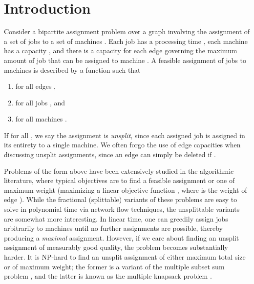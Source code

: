 \documentclass{llncs}
\begin{document}
\section{Introduction}
Consider a bipartite assignment problem over a graph  involving the assignment of a set of jobs  to a set of
machines . Each job  has a processing time , 
each machine  has a capacity , and there is a capacity
 for each edge  governing the maximum amount of job
 that can be assigned to machine .  A feasible assignment of
jobs to machines is described by a function  such that 
\begin{enumerate}
\item  for all edges ,
\item  for all jobs , and
\item  for all machines .
\end{enumerate}
If  for all , we say the assignment
is \emph{unsplit}, since each assigned job is assigned in its entirety
to a single machine. We often forgo the use of edge capacities 
when discussing unsplit assignments, since an edge  can simply be
deleted if .

Problems of the form above have been extensively studied in the
algorithmic literature, where typical objectives are to find a
feasible assignment or one of maximum weight (maximizing a linear
objective function , where  is the
weight of edge ).  While the fractional (splittable)
variants of these problems are easy to solve in polynomial time via
network flow techniques, the unsplittable variants are somewhat more
interesting.  In linear time, one can greedily assign jobs arbitrarily
to machines until no further assignments are possible, thereby
producing a {\em maximal} assignment.  However, if we care about
finding an unsplit assignment of measurably good quality, the problem
becomes substantially harder.  It is NP-hard to find an unsplit
assignment of either maximum total size 
or of maximum weight; the former is a variant of the multiple subset
sum problem \cite{Caprara2000111}, and the latter is known as the
multiple knapsack problem \cite{DBLP:journals/siamcomp/ChekuriK05}.
\end{document}
